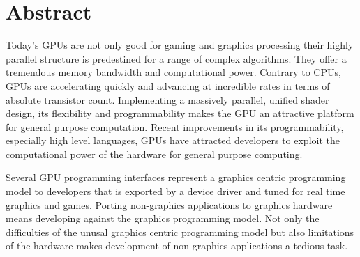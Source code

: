\begingroup
\let\clearpage\relax
\let\cleardoublepage\relax
\let\cleardoublepage\relax

\chapter*{Abstract}
Today's GPUs are not only good for gaming and graphics processing their highly parallel structure is predestined for a range of complex algorithms. They offer a tremendous memory bandwidth and computational power. Contrary to CPUs, GPUs are accelerating quickly and advancing at incredible rates in terms of absolute transistor count. Implementing a massively parallel, unified shader design, its flexibility and programmability makes the GPU an attractive platform for general purpose computation. Recent improvements in its programmability, especially high level languages, GPUs have attracted developers to exploit the computational power of the hardware for general purpose computing. 

Several GPU programming interfaces represent a graphics centric programming
model to developers that is exported by a device driver and tuned for real 
time graphics and games. Porting non-graphics applications to graphics hardware 
means developing against the graphics programming model. Not only the 
difficulties of the unusal graphics centric programming model but also
limitations of the hardware makes development of non-graphics applications a tedious
task. 

